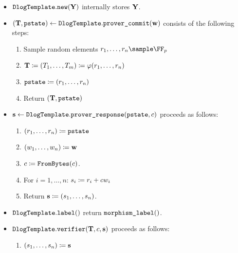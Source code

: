 \documentclass[11pt]{article}
\begin{document}
\begin{itemize}
  \item $\texttt{DlogTemplate}.\texttt{new}(\mathbf{Y})$ internally stores $\mathbf{Y}$.
  \item\label{item:basic:p1}
   $(\mathbf {T}, \texttt{pstate}) \gets \texttt{DlogTemplate}.\texttt{prover\_commit}(\mathbf {w})$ consists of the following steps:
    \begin{enumerate}
      \item\label{item:basic:p1:randomness}
        Sample random elements $\randomness_1,\dots,\randomness_n\sample\FF_p$
      \item
         $\mathbf {T} \coloneqq (T_1,\dots,T_m)\coloneqq\varphi(r_1,\dots,r_n)$
      \item $\texttt{pstate}\coloneqq (r_1,\dots,r_n)$
      \item
        Return $(\mathbf {T},\texttt{pstate})$
    \end{enumerate}
  \item\label{item:basic:p2}
    $\mathbf {s} \gets \texttt{DlogTemplate}.\texttt{prover\_response}(\texttt{pstate},c)$ proceeds as follows:
    \begin{enumerate}
      \item  $(r_1,\dots,r_n)\coloneqq \texttt{pstate}$
      \item  $(w_1,\dots,w_n)\coloneqq \mathbf {w}$
      \item
        $c \coloneqq \texttt{FromBytes}(c)$.
      \item For $i=1,\dots,n$: $s_i\coloneqq r_i+c w_i$
			\item Return $\mathbf{s} \coloneqq (s_1,\dots,s_n)$.
    \end{enumerate}
  \item $\texttt{DlogTemplate}.\texttt{label}()$ return $\texttt{morphism\_label}()$.
  \item\label{item:basic:v}
     $\texttt{DlogTemplate}.\texttt{verifier}(\mathbf {T},c,\mathbf {s})$ proceeds as follows:
    \begin{enumerate}
      \item  $(s_1, \dots, s_n) \coloneqq \mathbf {s}$

\end{enumerate}
\end{itemize}
\end{document}
